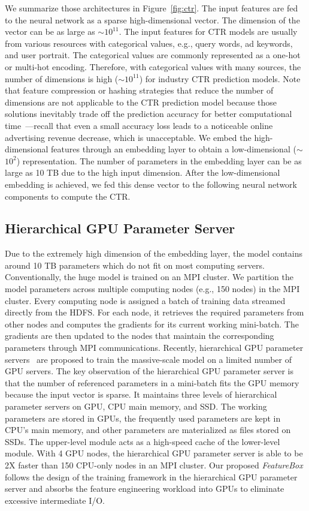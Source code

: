 \documentclass[sigconf]{acmart}
\begin{document}
We summarize those architectures in Figure~\ref{fig:ctr}. The input features are fed to the neural network as a sparse high-dimensional vector. The dimension of the vector can be as large as $\sim$$10^{11}$. The input features for CTR models are usually from various resources with categorical values, e.g., query words, ad keywords, and user portrait. The categorical values are commonly represented as a one-hot or multi-hot encoding. Therefore, with categorical values with many sources, the number of dimensions is high ($\sim$$10^{11}$) for industry CTR prediction models. Note that feature compression or hashing strategies that reduce the number of dimensions are not applicable to the CTR prediction model because those solutions inevitably trade off the prediction accuracy for better computational time~\cite{Article:Goemans_JACM95,Proc:Weinberger_ICML09,deng2021deeplight}---recall that even a small accuracy loss leads to a noticeable online advertising revenue decrease, which is unacceptable. We embed the high-dimensional features through an embedding layer to obtain a low-dimensional ($\sim$$10^2$) representation. The number of parameters in the embedding layer can be as large as 10 TB due to the high input dimension. After the low-dimensional embedding is achieved, we fed this dense vector to the following neural network components to compute the CTR. 

\subsection{Hierarchical GPU Parameter Server}
Due to the extremely high dimension of the embedding layer, the model contains around 10 TB parameters which do not fit on most computing servers. Conventionally, the huge model is trained on an MPI cluster. We partition the model parameters across multiple computing nodes (e.g., 150 nodes) in the MPI cluster. Every computing node is assigned a batch of training data streamed directly from the HDFS. 
For each node, it retrieves the required parameters from other nodes and computes the gradients for its current working mini-batch. The gradients are then updated to the nodes that maintain the corresponding parameters through MPI communications. Recently, hierarchical GPU parameter servers~\cite{Proc:Zhao_MLSys20} are proposed to train the massive-scale model on a limited number of GPU servers. The key observation of the hierarchical GPU parameter server is that the number of referenced parameters in a mini-batch fits the GPU memory because the input vector is sparse. It maintains three levels of hierarchical parameter servers on GPU, CPU main memory, and SSD. The working parameters are stored in GPUs, the frequently used parameters are kept in CPU's main memory, and other parameters are materialized as files stored on SSDs. The upper-level module acts as a high-speed cache of the lower-level module. With 4 GPU nodes, the hierarchical GPU parameter server is able to be 2X faster than 150 CPU-only nodes in an MPI cluster. 
Our proposed \emph{FeatureBox} follows the design of the training framework in the hierarchical GPU parameter server and absorbs the feature engineering workload into GPUs to eliminate excessive intermediate I/O.
\end{document}
